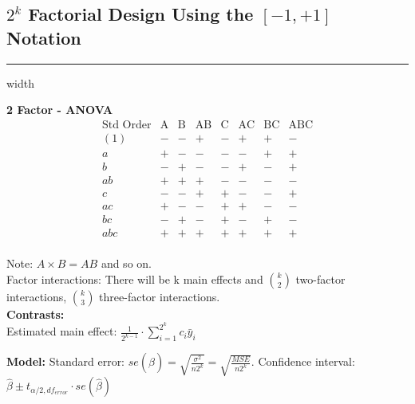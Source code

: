 \documentclass[10pt]{article}
\begin{document}
    \subsection*{$2^k$ Factorial Design Using the $[-1 , +1]$ Notation}
    \hrule width \textwidth
    \vspace{6pt}
    \begin{multicols}{2}
      \begin{flushleft}
        \textbf{2 Factor - ANOVA}
        \begin{equation*}
        \begin{array}{c|c|c|c|c|c|c|c}
          \text{Std Order} & \text{A} & \text{B} & \text{AB} & \text{C} & \text{AC} & \text{BC} & \text{ABC} \\
            \hline
            (1) & - & - & + & - & + & + & - \\
            a   & + & - & - & - & - & + & + \\
            b   & - & + & - & - & + & - & + \\
            ab  & + & + & + & - & - & - & - \\
            c   & - & - & + & + & - & - & + \\
            ac  & + & - & - & + & + & - & - \\
            bc  & - & + & - & + & - & + & - \\
            abc & + & + & + & + & + & + & + \\
        \end{array}
      \end{equation*}
      \end{flushleft}
    
        \begin{flushright}
          Note: $A \times B = AB$ and so on. \\
          Factor interactions: There will be k main effects and $\binom{k}{2}$ two-factor interactions, $\binom{k}{3}$ three-factor interactions. \\
          \textbf{Contrasts:} \\
          Estimated main effect: $\frac{1}{2^{k-1}} \cdot \sum_{i=1}^{2^k} c_i \bar{y}_i$
        \end{flushright}
      \end{multicols}
      \textbf{Model:}  Standard error: $se(\hat{\beta})= \sqrt{\frac{\sigma^2}{n2^k}} = \sqrt{\frac{MSE}{n2^k}}$. 
      Confidence interval: $\hat{\beta} \pm t_{\alpha/2, df_{error}} \cdot se(\hat{\beta})$\\
  
  
    
\end{document}
